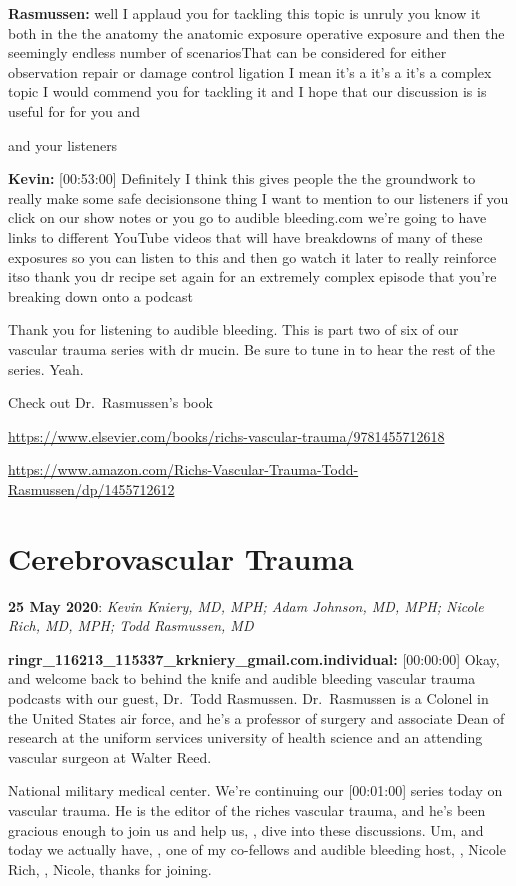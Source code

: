 \documentclass[
]{book}
\begin{document}
\textbf{Rasmussen:} well I applaud you for tackling this topic is unruly you
know it both in the the anatomy the anatomic exposure operative exposure
and then the seemingly endless number of scenariosThat can be considered
for either observation repair or damage control ligation I mean it's a
it's a it's a complex topic I would commend you for tackling it and I
hope that our discussion is is useful for for you and

and your listeners

\textbf{Kevin:} {[}00:53:00{]} Definitely I think this gives people the the
groundwork to really make some safe decisionsone thing I want to mention
to our listeners if you click on our show notes or you go to audible
bleeding.com we're going to have links to different YouTube videos that
will have breakdowns of many of these exposures so you can listen to
this and then go watch it later to really reinforce itso thank you dr
recipe set again for an extremely complex episode that you're breaking
down onto a podcast

Thank you for listening to audible bleeding. This is part two of six of
our vascular trauma series with dr mucin. Be sure to tune in to hear the
rest of the series. Yeah.

Check out Dr.~Rasmussen's book

\url{https://www.elsevier.com/books/richs-vascular-trauma/9781455712618}

\url{https://www.amazon.com/Richs-Vascular-Trauma-Todd-Rasmussen/dp/1455712612}

\hypertarget{cerebrovascular-trauma}{%
\section{Cerebrovascular Trauma}\label{cerebrovascular-trauma}}

\textbf{25 May 2020}: \emph{Kevin Kniery, MD, MPH; Adam Johnson, MD, MPH; Nicole
Rich, MD, MPH; Todd Rasmussen, MD}

\textbf{ringr\_116213\_115337\_krkniery\_gmail.com.individual:} {[}00:00:00{]} Okay,
and welcome back to behind the knife and audible bleeding vascular
trauma podcasts with our guest, Dr.~Todd Rasmussen. Dr.~Rasmussen is a
Colonel in the United States air force, and he's a professor of surgery
and associate Dean of research at the uniform services university of
health science and an attending vascular surgeon at Walter Reed.

National military medical center. We're continuing our {[}00:01:00{]} series
today on vascular trauma. He is the editor of the riches vascular
trauma, and he's been gracious enough to join us and help us, , dive
into these discussions. Um, and today we actually have, , one of my
co-fellows and audible bleeding host, , Nicole Rich, , Nicole, thanks
for joining.
\end{document}
